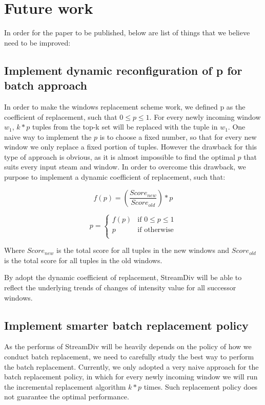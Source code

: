 \section{Future work} 

In order for the paper to be published, below are list of things that we believe need to be improved:

\subsection{Implement dynamic reconfiguration of p for batch approach}

In order to make the windows replacement scheme work, we defined p as the coefficient of replacement, such that $0 \leq p \leq 1$. For every newly incoming window $w_1$, $k*p$ tuples from the top-k set will be replaced with the tuple in $w_1$. One naive way to implement the $p$ is to choose a fixed number, so that for every new window we only replace a fixed portion of tuples. However the drawback for this type of approach is obvious, as it is almost impossible to find the optimal $p$ that suits every input steam and window. In order to overcome this drawback, we purpose to implement a dynamic coefficient of replacement, such that:

\begin{equation}
  f(p) = (\dfrac{Score_{new}}{Score_{old}}) * p
\end{equation}

\begin{equation}
  p =
  \begin{cases}
    f(p) & \text{if $0 \leq p \leq 1$}\\
    p & \text{if otherwise}\\
   \end{cases}
\end{equation}

Where $Score_{new}$ is the total score for all tuples in the new windows and $Score_{old}$ is the total score for all tuples in the old windows.

By adopt the dynamic coefficient of replacement, StreamDiv will be able to reflect the underlying trends of changes of intensity value for all successor windows.

\subsection{Implement smarter batch replacement policy}

As the performs of StreamDiv will be heavily depends on the policy of how we conduct batch replacement, we need to carefully study the best way to perform the batch replacement. Currently, we only adopted a very naive approach for the batch replacement policy, in which for every newly incoming window we will run the incremental replacement algorithm $k * p$ times. Such replacement policy does not guarantee the optimal performance.

